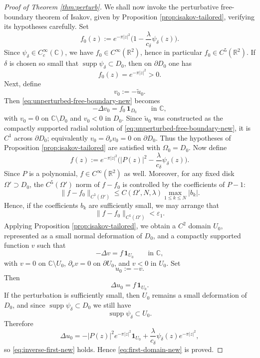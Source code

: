 \documentclass[a4paper,11pt,reqno]{amsart}
\numberwithin{equation}{section}
\theoremstyle{plain} %
\theoremstyle{definition} %
\theoremstyle{remark}
\DeclareMathOperator{\supp}{supp}
\newcommand{\R}{\mathbb{R}}
\newcommand{\C}{\mathbb{C}}
\begin{document}
\begin{proof}[Proof of Theorem \ref{thm:perturb}]
We shall now invoke the perturbative free-boundary theorem of Isakov, given by Proposition \ref{prop:isakov-tailored}, verifying its hypotheses carefully. Set
\[
f_0(z):=e^{-\pi|z|^2}\Big(1-\frac{\lambda}{c_\delta}\psi_\delta(z)\Big).
\]
Since $\psi_\delta\in C_c^\infty(\C)$, we have $f_0\in C^\infty(\R^2)$, hence in particular $f_0\in C^5(\R^2)$. If $\delta$ is chosen so small that $\supp\psi_\delta\subset D_0$, then on $\partial D_0$ one has
\[
f_0(z)=e^{-\pi|z|^2}>0.
\]
Next, define
\[
v_0:=-\widetilde u_0.
\]
Then \eqref{eq:unperturbed-free-boundary-new} becomes
\[
-\Delta v_0=f_0\,\mathbf{1}_{D_0}
\qquad \text{in }\C,
\]
with \(v_0=0\) on \(\C\setminus D_0\) and \(v_0<0\) in \(D_0\). Since \(\widetilde u_0\) was constructed as the compactly supported radial solution of \eqref{eq:unperturbed-free-boundary-new}, it is \(C^1\) across \(\partial D_0\); equivalently \(v_0=\partial_\nu v_0=0\) on \(\partial D_0\). Thus the hypotheses
of Proposition \ref{prop:isakov-tailored} are satisfied with \(\Omega_0=D_0\).
Now define
\[
f(z):=e^{-\pi|z|^2}\Big(|P(z)|^2-\frac{\lambda}{c_\delta}\psi_\delta(z)\Big).
\]
Since $P$ is a polynomial, $f\in C^\infty(\R^2)$ as well. Moreover, for any fixed disk $\Omega'\supset D_0$, the $C^5(\Omega')$ norm of $f-f_0$ is controlled by the coefficients of $P-1$:
\[
\|f-f_0\|_{C^5(\Omega')}\le C(\Omega',N,\lambda)\max_{1\le k\le N}|b_k|.
\]
Hence, if the coefficients $b_k$ are sufficiently small, we may arrange that
\[
\|f-f_0\|_{C^5(\Omega')}<\varepsilon_1.
\]
Applying Proposition \ref{prop:isakov-tailored}, we obtain a \(C^2\) domain \(U_0\), represented as a small normal deformation of \(D_0\), and a compactly supported function \(v\) such that
\[
-\Delta v=f\,\mathbf{1}_{U_0}
\qquad \text{in }\C,
\]
with \(v=0\) on \(\C\setminus U_0\), \(\partial_\nu v=0\) on \(\partial U_0\), and \(v<0\) in \(U_0\). Set
\[
u_0:=-v.
\]
Then
\[
\Delta u_0=f\,\mathbf{1}_{U_0}.
\]
If the perturbation is sufficiently small, then $U_0$ remains a small deformation of $D_0$, and since $\supp\psi_\delta\subset D_0$ we still have
\[
\supp\psi_\delta\subset U_0.
\]
Therefore
\[
\Delta u_0
=
-|P(z)|^2e^{-\pi|z|^2}\mathbf{1}_{U_0}
+\frac{\lambda}{c_\delta}\psi_\delta(z)e^{-\pi|z|^2},
\]
so \eqref{eq:inverse-first-new} holds. Hence \eqref{eq:first-domain-new} is proved.


\end{proof}
\end{document}
